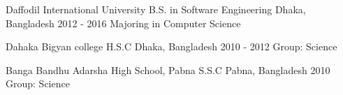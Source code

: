 

\begin{cventries}

  \cventry
  	{Daffodil International University} %
    {B.S. in Software Engineering} %
    {Dhaka, Bangladesh} %
    {2012 - 2016} %
    {Majoring in Computer Science}
    
  \cventry
  	{Dahaka Bigyan college} %
    {H.S.C} %
    {Dhaka, Bangladesh} %
    {2010 - 2012} %
    {Group: Science}
    
  \cventry
  	{Banga Bandhu Adarsha High School, Pabna} %
    {S.S.C} %
    {Pabna, Bangladesh} %
    {2010} %
    {Group: Science}

\end{cventries}
